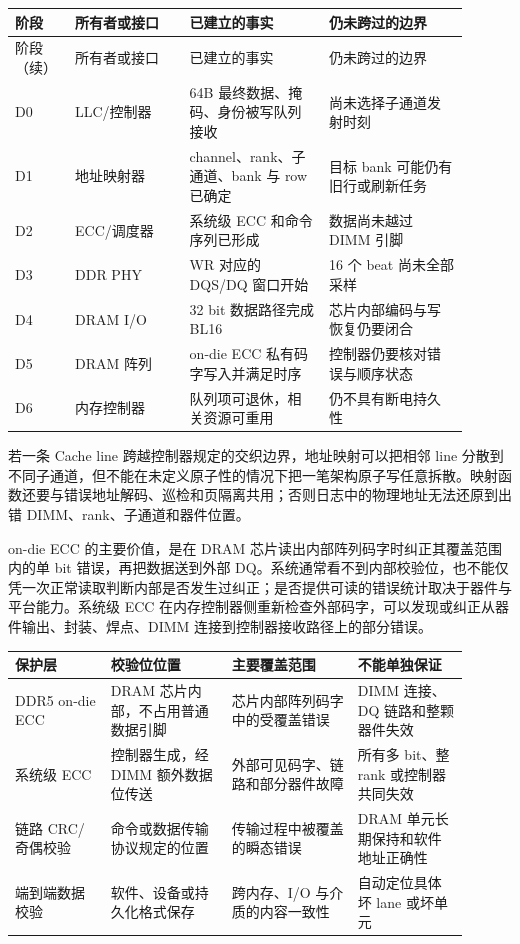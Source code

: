 \begin{longtable}{L{0.09\linewidth}L{0.23\linewidth}L{0.29\linewidth}L{0.29\linewidth}}
\toprule
阶段 & 所有者或接口 & 已建立的事实 & 仍未跨过的边界 \\
\midrule
\endfirsthead
\toprule
阶段（续） & 所有者或接口 & 已建立的事实 & 仍未跨过的边界 \\
\midrule
\endhead
D0 & LLC/控制器 & 64B 最终数据、掩码、身份被写队列接收 & 尚未选择子通道发射时刻 \\\tablerowrule
D1 & 地址映射器 & channel、rank、子通道、bank 与 row 已确定 & 目标 bank 可能仍有旧行或刷新任务 \\\tablerowrule
D2 & ECC/调度器 & 系统级 ECC 和命令序列已形成 & 数据尚未越过 DIMM 引脚 \\\tablerowrule
D3 & DDR PHY & WR 对应的 DQS/DQ 窗口开始 & 16 个 beat 尚未全部采样 \\\tablerowrule
D4 & DRAM I/O & 32 bit 数据路径完成 BL16 & 芯片内部编码与写恢复仍要闭合 \\\tablerowrule
D5 & DRAM 阵列 & on-die ECC 私有码字写入并满足时序 & 控制器仍要核对错误与顺序状态 \\\tablerowrule
D6 & 内存控制器 & 队列项可退休，相关资源可重用 & 仍不具有断电持久性 \\
\bottomrule
\end{longtable}

若一条 Cache line 跨越控制器规定的交织边界，地址映射可以把相邻 line 分散到不同子通道，但不能在未定义原子性的情况下把一笔架构原子写任意拆散。映射函数还要与错误地址解码、巡检和页隔离共用；否则日志中的物理地址无法还原到出错 DIMM、rank、子通道和器件位置。


on-die ECC 的主要价值，是在 DRAM 芯片读出内部阵列码字时纠正其覆盖范围内的单 bit 错误，再把数据送到外部 DQ。系统通常看不到内部校验位，也不能仅凭一次正常读取判断内部是否发生过纠正；是否提供可读的错误统计取决于器件与平台能力。系统级 ECC 在内存控制器侧重新检查外部码字，可以发现或纠正从器件输出、封装、焊点、DIMM 连接到控制器接收路径上的部分错误。

\begin{longtable}{L{0.19\linewidth}L{0.24\linewidth}L{0.25\linewidth}L{0.22\linewidth}}
\toprule
保护层 & 校验位位置 & 主要覆盖范围 & 不能单独保证 \\
\midrule
DDR5 on-die ECC & DRAM 芯片内部，不占用普通数据引脚 & 芯片内部阵列码字中的受覆盖错误 & DIMM 连接、DQ 链路和整颗器件失效 \\\tablerowrule
系统级 ECC & 控制器生成，经 DIMM 额外数据位传送 & 外部可见码字、链路和部分器件故障 & 所有多 bit、整 rank 或控制器共同失效 \\\tablerowrule
链路 CRC/奇偶校验 & 命令或数据传输协议规定的位置 & 传输过程中被覆盖的瞬态错误 & DRAM 单元长期保持和软件地址正确性 \\\tablerowrule
端到端数据校验 & 软件、设备或持久化格式保存 & 跨内存、I/O 与介质的内容一致性 & 自动定位具体坏 lane 或坏单元 \\
\bottomrule
\end{longtable}

